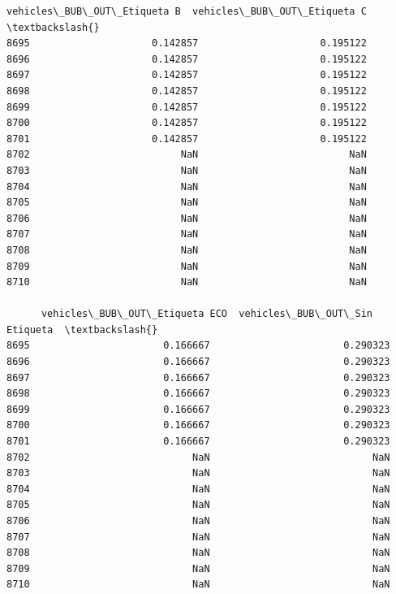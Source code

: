 \documentclass[11pt]{article}
\begin{document}
\begin{tcolorbox}[breakable, size=fbox, boxrule=.5pt, pad at break*=1mm, opacityfill=0]
\begin{Verbatim}[commandchars=\\\{\}]
      vehicles\_BUB\_OUT\_Etiqueta B  vehicles\_BUB\_OUT\_Etiqueta C  \textbackslash{}
8695                     0.142857                     0.195122
8696                     0.142857                     0.195122
8697                     0.142857                     0.195122
8698                     0.142857                     0.195122
8699                     0.142857                     0.195122
8700                     0.142857                     0.195122
8701                     0.142857                     0.195122
8702                          NaN                          NaN
8703                          NaN                          NaN
8704                          NaN                          NaN
8705                          NaN                          NaN
8706                          NaN                          NaN
8707                          NaN                          NaN
8708                          NaN                          NaN
8709                          NaN                          NaN
8710                          NaN                          NaN

      vehicles\_BUB\_OUT\_Etiqueta ECO  vehicles\_BUB\_OUT\_Sin Etiqueta  \textbackslash{}
8695                       0.166667                       0.290323
8696                       0.166667                       0.290323
8697                       0.166667                       0.290323
8698                       0.166667                       0.290323
8699                       0.166667                       0.290323
8700                       0.166667                       0.290323
8701                       0.166667                       0.290323
8702                            NaN                            NaN
8703                            NaN                            NaN
8704                            NaN                            NaN
8705                            NaN                            NaN
8706                            NaN                            NaN
8707                            NaN                            NaN
8708                            NaN                            NaN
8709                            NaN                            NaN
8710                            NaN                            NaN


\end{Verbatim}
\end{tcolorbox}
\end{document}
